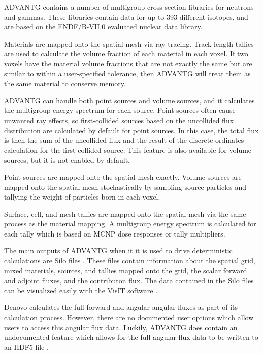 ADVANTG contains a number of multigroup cross section libraries for neutrons and gammas.
These libraries contain data for up to 393 different isotopes, and are based on the ENDF/B-VII.0 \cite{endfb7.0} evaluated nuclear data library.

Materials are mapped onto the spatial mesh via ray tracing.
Track-length tallies are used to calculate the volume fraction of each material in each voxel.
If two voxels have the material volume fractions that are not exactly the same but are similar to within a user-specified tolerance, then ADVANTG will treat them as the same material to conserve memory.

ADVANTG can handle both point sources and volume sources, and it calculates the multigroup energy spectrum for each source.
Point sources often cause unwanted ray effects, so first-collided sources based on the uncollided flux distribution are calculated by default for point sources.
In this case, the total flux is then the sum of the uncollided flux and the result of the discrete ordinates calculation for the first-collided source.
This feature is also available for volume sources, but it is not enabled by default.

Point sources are mapped onto the spatial mesh exactly.
Volume sources are mapped onto the spatial mesh stochastically by sampling source particles and tallying the weight of particles born in each voxel.

Surface, cell, and mesh tallies are mapped onto the spatial mesh via the same process as the material mapping. A multigroup energy spectrum is calculated for each tally which is based on MCNP dose responses or tally multipliers.

The main outputs of ADVANTG when it it is used to drive deterministic calculations are Silo files \cite{silo}.
These files contain information about the spatial grid, mixed materials, sources, and tallies mapped onto the grid, the scalar forward and adjoint fluxes, and the contributon flux.
The data contained in the Silo files can be visualized easily with the VisIT software \cite{visit}.

Denovo calculates the full forward and angular angular fluxes as part of its calculation process.
However, there are no documented user options which allow users to access this angular flux data.
Luckily, ADVANTG does contain an undocumented feature which allows for the full angular flux data to be written to an HDF5 file \cite{hdf5}.
